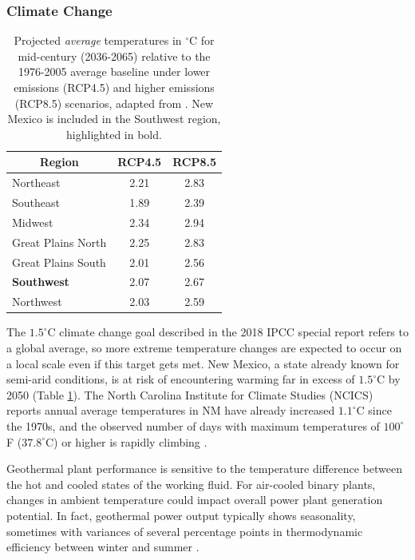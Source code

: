 \subsubsection{Climate Change}\label{ch4:climate_uncertainty}
\begin{table}
\centering
\begin{tabular}{|l|c|c|}
\hline
\multicolumn{1}{|c|}{\textbf{Region}} & \textbf{RCP4.5} & \textbf{RCP8.5} \\ \hline
Northeast & 2.21 & 2.83 \\ \hline
Southeast & 1.89 & 2.39 \\ \hline
Midwest & 2.34 & 2.94 \\ \hline
Great Plains North & 2.25 & 2.83 \\ \hline
Great Plains South & 2.01 & 2.56 \\ \hline
\textbf{Southwest} & 2.07 & 2.67 \\ \hline
Northwest & 2.03 & 2.59 \\ \hline
\end{tabular}
\caption[Projected regional temperature changes]{Projected \textit{average} temperatures in $^\circ$C for mid-century (2036-2065) relative to the 1976-2005 average baseline under lower emissions (RCP4.5) and higher emissions (RCP8.5) scenarios, adapted from \protect\citep[Table 6.4]{vose_temperature_2017}. New Mexico is included in the Southwest region, highlighted in bold.}
\label{tab:reg_climate}
\end{table}

The $1.5^\circ$C climate change goal described in the 2018 IPCC special report \citep{ipcc_global_2018} refers to a global average, so more extreme temperature changes are expected to occur on a local scale even if this target gets met. New Mexico, a state already known for semi-arid conditions, is at risk of encountering warming far in excess of $1.5^\circ$C by 2050 (Table \ref{tab:reg_climate}). The North Carolina Institute for Climate Studies (NCICS) reports annual average temperatures in NM have already increased $1.1^\circ$C since the 1970s, and the observed number of days with maximum temperatures of $100^\circ$F ($37.8^\circ$C) or higher is rapidly climbing \citep{frankson_new_2019}.

Geothermal plant performance is sensitive to the temperature difference between the hot and cooled states of the working fluid. For air-cooled binary plants, changes in ambient temperature could impact overall power plant generation potential. In fact, geothermal power output typically shows seasonality, sometimes with variances of several percentage points in thermodynamic efficiency between winter and summer \citep[p.\ 52]{glassley_geothermal_2015}.  

